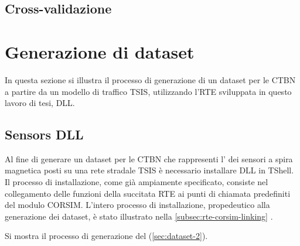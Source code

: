 \subsection{Cross-validazione}

\section{Generazione di dataset}\label{sec:create-dataset-howto}
In questa sezione si illustra il processo di generazione di un dataset per le \acs{CTBN} a partire da un modello di traffico \acs{TSIS}, utilizzando l'\acl{RTE} sviluppata in questo lavoro di tesi,  \acs{DLL}.

\subsection{Sensors DLL}
Al fine di generare un dataset per le \acs{CTBN} che rappresenti l' dei sensori a spira magnetica posti su una rete stradale \acs{TSIS} è necessario installare  \acs{DLL} in \acs{TShell}. Il processo di installazione, come già ampiamente specificato, consiste nel collegamento delle funzioni della succitata \acs{RTE} ai punti di chiamata predefiniti del modulo \acs{CORSIM}. L'intero processo di installazione, propedeutico alla generazione dei dataset, è stato illustrato nella \autoref{subsec:rte-corsim-linking} .

Si mostra il processo di generazione del  (\vref{sec:dataset-2}).

